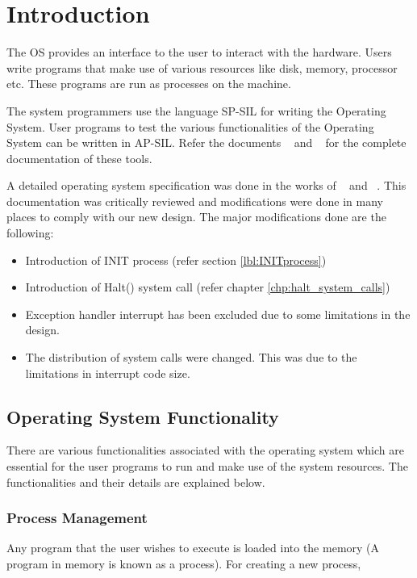 \chapter{Introduction}
\label{chp:osintro}
The OS provides an interface to the user to interact with the hardware. Users write programs that make use of various resources like disk, memory, processor etc. These programs are run as processes on the machine.

The system programmers use the language SP-SIL for writing the Operating System. User programs to test the various functionalities of the Operating System can be written in AP-SIL. Refer the documents ~\cite{spsil} and ~\cite{apsil} for the complete documentation of these tools.

A detailed operating system specification was done in the works of ~\cite{group1} and ~\cite{group2}. This documentation was critically reviewed and modifications were done in many places to comply with our new design.
The major modifications done are the following:
\begin{itemize}
\item Introduction of INIT process (refer section \ref{lbl:INITprocess})
\item Introduction of Halt() system call (refer chapter \ref{chp:halt_system_calls})
\item Exception handler interrupt has been excluded due to some limitations in the design.
\item The distribution of system calls were changed. This was due to the limitations in interrupt code size.
\end{itemize}

\section{Operating System Functionality}
There are various functionalities associated with the operating system which are essential for the user programs to run and make use of the system resources. The functionalities and their details are explained below.

\subsection{Process Management}
Any program that the user wishes to execute is loaded into the memory (A program in memory is known as a process). For creating a new process,


